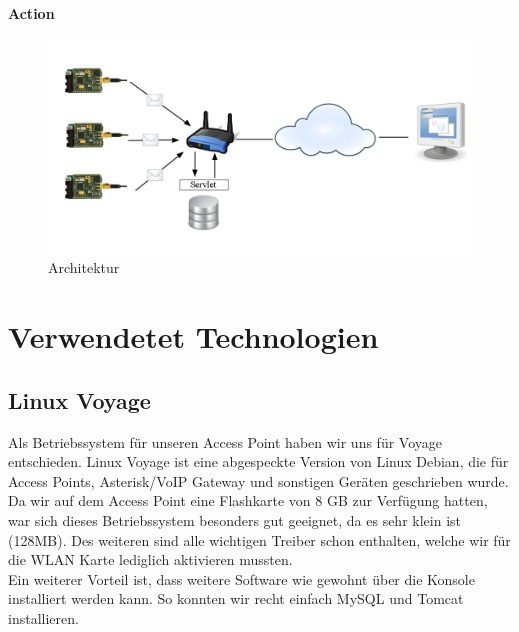 \documentclass[12pt,a4paper,twoside]{article}
\newcommand{\labelSec}[1]{\label{sec:#1}}
\begin{document}
\paragraph{Action}




\begin{figure}[htbp]
   \centering
   \includegraphics[width=12cm]{fig/Architektur.png}
   \caption{Architektur}
   \label{architecture}
\end{figure}


\section{Verwendetet Technologien} \labelSec{abschnitt}
\subsection{Linux Voyage \cite{voyage}} 
Als Betriebssystem für unseren Access Point haben wir uns für Voyage entschieden. Linux Voyage ist eine abgespeckte Version von Linux Debian, die für Access Points, Asterisk/VoIP Gateway und sonstigen Geräten geschrieben wurde. Da wir auf dem Access Point eine Flashkarte von 8 GB zur Verfügung hatten, war sich dieses Betriebssystem besonders gut geeignet, da es sehr  klein ist (128MB). Des weiteren sind alle wichtigen Treiber schon enthalten, welche wir für die WLAN Karte lediglich aktivieren mussten. \\
Ein weiterer Vorteil ist, dass weitere Software wie gewohnt über die Konsole installiert werden kann. So konnten wir recht einfach MySQL und Tomcat installieren.
\end{document}
